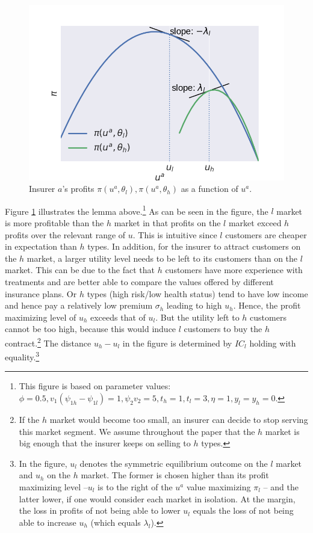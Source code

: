 \documentclass[a4paper,12pt]{article}
\begin{document}
\begin{figure}[htbp]
\centering
\includegraphics[width=.9\linewidth]{profitfunctions.png}
\caption{\label{fig:profitfunctions}Insurer \(a\)'s profits \(\pi(u^a,\theta_l),\pi(u^a,\theta_h)\) as a function of \(u^a\).}
\end{figure}

Figure \ref{fig:profitfunctions} illustrates the lemma above.\footnote{This figure is based on parameter values: \(\phi=0.5,v_1(\psi_{1h}-\psi_{1l})=1,\psi_2v_2=5,t_h=1,t_l=3,\eta =1,y_l=y_h=0\).} As can be seen in the figure, the \(l\) market is more profitable than the \(h\) market in that profits on the \(l\) market exceed \(h\) profits over the relevant range of \(u\). This is intuitive since \(l\) customers are cheaper in expectation than \(h\) types. In addition, for the insurer to attract customers on the \(h\) market, a larger utility level needs to be left to its customers than on the \(l\) market. This can be due to the fact that \(h\) customers have more experience with treatments and are better able to compare the values offered by different insurance plans. Or \(h\) types (high risk/low health status) tend to have low income and hence pay a relatively low premium \(\sigma_h\) leading to high \(u_h\). Hence, the profit maximizing level of \(u_h\) exceeds that of \(u_l\). But the utility left to \(h\) customers cannot be too high, because this would induce \(l\) customers to buy the \(h\) contract.\footnote{If the \(h\) market would become too small, an insurer can decide to stop serving this market segment. We assume throughout the paper that the \(h\) market is big enough that the insurer keeps on selling to \(h\) types.} The distance \(u_h - u_l\) in the figure is determined by \(IC_l\) holding with equality.\footnote{In the figure, \(u_l\) denotes the symmetric equilibrium outcome on the \(l\) market and \(u_h\) on the \(h\) market. The former is chosen higher than its profit maximizing level --\(u_{l}\) is to the right of the \(u^a\) value maximizing \(\pi_{l}\) -- and the latter lower, if one would consider each market in isolation. At the margin, the loss in profits of not being able to lower \(u_l\) equals the loss of not being able to increase \(u_h\) (which equals \(\lambda_{l}\)).}
\end{document}
